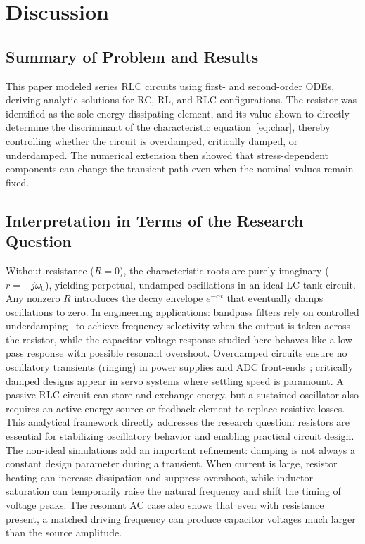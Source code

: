 \section{Discussion}
\label{sec:discussion}

\subsection{Summary of Problem and Results}

This paper modeled series RLC circuits using first- and second-order ODEs,
deriving analytic solutions for RC, RL, and RLC configurations.
The resistor was identified as the sole energy-dissipating element, and its
value shown to directly determine the discriminant of the characteristic
equation~\eqref{eq:char}, thereby controlling whether the circuit is
overdamped, critically damped, or underdamped.
The numerical extension then showed that stress-dependent components can
change the transient path even when the nominal values remain fixed.

\subsection{Interpretation in Terms of the Research Question}

Without resistance ($R = 0$), the characteristic roots are purely imaginary
($r = \pm j\omega_0$), yielding perpetual, undamped oscillations in an ideal
LC tank circuit.
Any nonzero $R$ introduces the decay envelope $e^{-\alpha t}$ that eventually
damps oscillations to zero.
In engineering applications: bandpass filters rely on controlled underdamping~\cite{williams2006}
to achieve frequency selectivity when the output is taken across the resistor,
while the capacitor-voltage response studied here behaves like a low-pass
response with possible resonant overshoot. Overdamped circuits ensure no
oscillatory transients (ringing) in power supplies and ADC front-ends~\cite{williams2006}; critically damped designs appear
in servo systems where settling speed is paramount. A passive RLC circuit can
store and exchange energy, but a sustained oscillator also requires an active
energy source or feedback element to replace resistive losses.
This analytical framework directly addresses the research question: resistors
are essential for stabilizing oscillatory behavior and enabling practical
circuit design.
The non-ideal simulations add an important refinement: damping is not always
a constant design parameter during a transient.
When current is large, resistor heating can increase dissipation and suppress
overshoot, while inductor saturation can temporarily raise the natural
frequency and shift the timing of voltage peaks.
The resonant AC case also shows that even with resistance present, a matched
driving frequency can produce capacitor voltages much larger than the source
amplitude.

